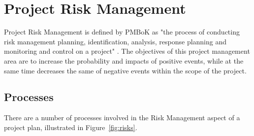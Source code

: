 \chapter{Project Risk Management}

Project Risk Management is defined by PMBoK as "the process of conducting risk management planning, identification, analysis, response planning and monitoring and control on a project" \parencite{pmbok}. The objectives of this project management area are to increase the probability and impacts of positive events, while at the same time decreases the same of negative events within the scope of the project. 

\section{Processes}

There are a number of processes involved in the Risk Management aspect of a project plan, illustrated in Figure~\ref{fig:risks}.

